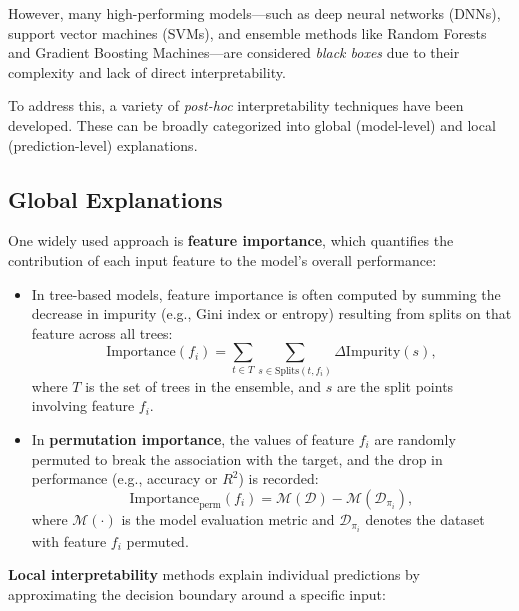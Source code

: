 However, many high-performing models---such as deep neural networks (DNNs),
support vector machines (SVMs), and ensemble methods like Random Forests and
Gradient Boosting Machines---are considered \emph{black boxes} due to their
complexity and lack of direct interpretability.

To address this, a variety of \emph{post-hoc} interpretability techniques have
been developed. These can be broadly categorized into global (model-level) and
local (prediction-level) explanations.

\subsection*{Global Explanations}

One widely used approach is \textbf{feature importance}, which quantifies the
contribution of each input feature to the model's overall performance:

\begin{itemize}
    \item In tree-based models, feature importance is often computed by summing the
          decrease in impurity (e.g., Gini index or entropy) resulting from splits on
          that feature across all trees: \begin{equation} \text{Importance}(f_i) =
              \sum_{t \in T} \sum_{s \in \text{Splits}(t, f_i)} \Delta \text{Impurity}(s),
          \end{equation}
          where $T$ is the set of trees in the ensemble, and $s$ are the split points
          involving feature $f_i$.

    \item In \textbf{permutation importance}, the values of feature $f_i$ are randomly
          permuted to break the association with the target, and the drop in performance
          (e.g., accuracy or $R^2$) is recorded:
          \begin{equation} \text{Importance}_{\text{perm}}(f_i) =
              \mathcal{M}(\mathcal{D}) - \mathcal{M}(\mathcal{D}_{\pi_i}),
          \end{equation}
          where $\mathcal{M}(\cdot)$ is the model evaluation metric and
          $\mathcal{D}_{\pi_i}$ denotes the dataset with feature $f_i$ permuted.
\end{itemize}

\textbf{Local interpretability} methods explain individual predictions by approximating
the decision boundary around a specific input:

